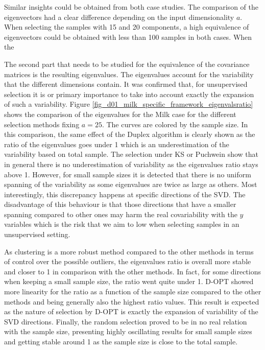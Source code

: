 \documentclass[journal=ancham,manuscript=article]{achemso}
\begin{document}
Similar insights could be obtained from both case studies. The comparison of the eigenvectors had a clear difference depending on the input dimensionality $a$. When selecting the samples with 15 and 20 components, a high equivalence of eigenvectors could be obtained with less than 100 samples in both cases. When the 

The second part that needs to be studied for the equivalence of the covariance matrices is the resulting eigenvalues. The eigenvalues account for the variability that the different dimensions contain. It was confirmed that, for unsupervised selection it is or primary importance to take into account exactly the expansion of such a variability. Figure \ref{fig_d01_milk_specific_framework_eigenvalsratio} shows the comparison of the eigenvalues for the Milk case for the different selection methods fixing $a=25$. The curves are colored by the sample size. In this comparison, the same effect of the Duplex algorithm is clearly shown as the ratio of the eigenvalues goes under 1 which is an underestimation of the variability based on total sample.  The selection under KS or Puchwein show that in general there is no underestimation of variability as the eigenvalues ratio stays above 1. However, for small sample sizes it is detected that there is no uniform spanning of the variability as some eigenvalues are twice as large as others. Most interestingly, this discrepancy happens at specific directions of the SVD. The disadvantage of this behaviour is that those directions that have a smaller spanning compared to other ones may harm the real covariability with the $y$ variables which is the risk that we aim to low when selecting samples in an unsupervised setting. 

As clustering is a more robust method compared to the other methods in terms of control over the possible outliers, the eigenvalues ratio is overall more stable and closer to 1 in comparison with the other methods. In fact, for some directions when keeping a small sample size, the ratio went quite under 1. D-OPT showed more linearity for the ratio as a function of the sample size compared to the other methods and being generally also the highest ratio values. This result is expected as the nature of selection by D-OPT is exactly the expansion of variability of the SVD directions.  Finally, the random selection proved to be in no real relation with the sample size, presenting highly oscillating results for small sample sizes and getting stable around 1 as the sample size is close to the total sample. 
\end{document}
